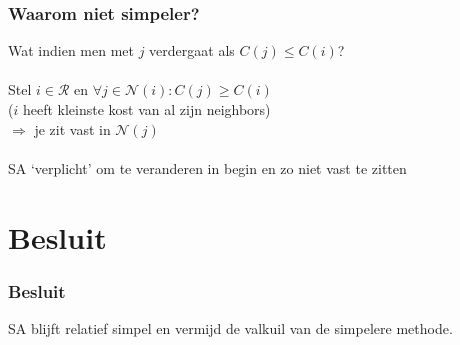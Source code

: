 \documentclass
   [kulak] %
   {kulakbeamer}
\begin{document}
\begin{frame}
	\frametitle{Waarom niet simpeler?}
	Wat indien men met $j$ verdergaat als $C(j) \leq C(i)$?\\~\\
	\pause
	Stel $i \in \mathscr{R}$ en $\forall j \in \mathscr{N}(i): C(j) \geqslant C(i)$ \\($i$ heeft kleinste kost van al zijn neighbors) \\
	$\Rightarrow$ je zit vast in $\mathscr{N}(j)$ \\~\\
	\pause
	SA `verplicht' om te veranderen in begin en zo niet vast te zitten
\end{frame}

\section{Besluit}
\begin{frame}
\frametitle{Besluit}
SA blijft relatief simpel en vermijd de valkuil van de simpelere methode.
\end{frame}
\end{document}
